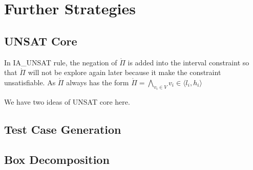 \chapter{Further Strategies}
\section{UNSAT Core}
In \tiny IA\_UNSAT \normalsize rule, the negation of $\mathring\Pi$ is added into the interval constraint so that $\mathring\Pi$ will not be explore again later because it make the constraint unsatisfiable. As $\mathring\Pi$ always has the form $\mathring\Pi = \bigwedge\limits_{v_i \in V} v_i \in \langle l_i, h_i \rangle$

We have two ideas of UNSAT core here.
\section{Test Case Generation}
\section{Box Decomposition}